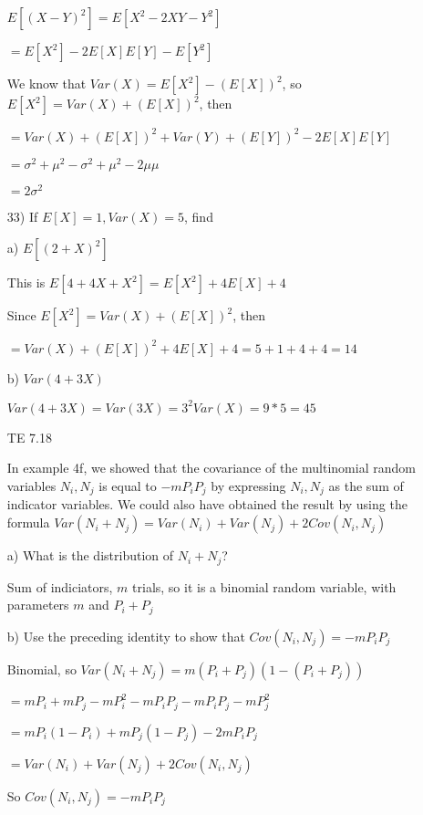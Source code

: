 \documentclass[11pt]{article}
\begin{document}
\begin{itemize}
	$E[(X-Y)^2] = E[X^2 - 2XY - Y^2]$

	$=E[X^2] -2E[X]E[Y] - E[Y^2]$

	We know that $Var(X) = E[X^2] - (E[X])^2$, so $E[X^2] = Var(X) + (E[X])^2$, then

	$=Var(X) + (E[X])^2 + Var(Y) + (E[Y])^2 - 2E[X]E[Y]$

	$=\sigma^2 + \mu^2 - \sigma^2 + \mu^2 - 2\mu\mu$

	$=2\sigma^2$

	33) If $E[X] = 1, Var(X) = 5$, find 
	
	a) $E[(2 + X)^2]$

	This is $E[4 + 4X + X^2] = E[X^2] + 4E[X] + 4$
	
	Since $E[X^2] = Var(X) + (E[X])^2$, then
	
	$=Var(X) + (E[X])^2 + 4E[X] + 4= 5 + 1 + 4 + 4 = 14$

	b) $Var(4+3X)$

	$Var(4 + 3X) = Var(3X) = 3^2 Var(X) = 9*5 = 45$

\item[TE 7.18]

	In example 4f, we showed that the covariance of the multinomial random variables $N_i, N_j$ is equal to $-mP_i P_j$ by expressing $N_i, N_j$ as the sum of indicator variables. We could also have obtained the result by using the formula $Var(N_i + N_j) = Var(N_i) + Var(N_j) + 2Cov(N_i,N_j)$

	a) What is the distribution of $N_i + N_j$?

	Sum of indiciators, $m$ trials, so it is a binomial random variable, with parameters $m$ and $P_i + P_j$

	b) Use the preceding identity to show that $Cov(N_i,N_j) = -mP_i P_j$

	Binomial, so $Var(N_i + N_j) = m(P_i + P_j)(1-(P_i + P_j))$

	$=mP_i + mP_j -mP_i^2 -mP_iP_j -mP_iP_j -mP_j^2$

	$=mP_i(1-P_i) + mP_j(1-P_j) - 2mP_iP_j$

	$=Var(N_i) + Var(N_j) + 2Cov(N_i,N_j)$

	So $Cov(N_i, N_j) = -mP_iP_j$
\end{itemize}
\end{document}
